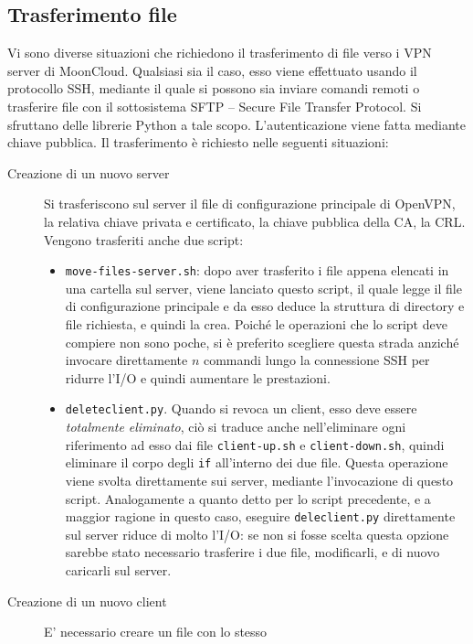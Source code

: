 \subsection{Trasferimento file}
Vi sono diverse situazioni che richiedono il trasferimento di file
verso i VPN server di MoonCloud. Qualsiasi sia il caso, esso viene effettuato
usando il protocollo SSH, mediante il quale si possono sia inviare comandi remoti
o trasferire file con il sottosistema SFTP -- Secure File Transfer Protocol. Si sfruttano
delle librerie Python a tale scopo. L'autenticazione viene fatta mediante chiave
pubblica.
Il trasferimento è richiesto nelle seguenti situazioni:
\begin{description}
	\item[Creazione di un nuovo server]Si trasferiscono sul server il file
	di configurazione principale di OpenVPN, la relativa chiave privata e certificato,
	la chiave pubblica della CA, la CRL.
	Vengono trasferiti anche due script:
	\begin{itemize}
		\item \texttt{move-files-server.sh}: dopo aver trasferito i file appena elencati
		      in una cartella sul server, viene lanciato questo script, il quale legge il file
		      di configurazione principale e da esso deduce la struttura di directory e file
		      richiesta, e quindi la crea.
		      Poiché le operazioni che lo script deve compiere non sono poche, si è
		      preferito scegliere questa strada anziché invocare direttamente $n$ commandi 
		      lungo la connessione SSH per ridurre l'I/O e quindi aumentare le prestazioni.
		\item \texttt{deleteclient.py}. Quando si revoca un client, esso deve essere
		      \textit{totalmente eliminato}, ciò si traduce anche nell'eliminare ogni riferimento
		      ad esso dai file \texttt{client-up.sh} e \texttt{client-down.sh}, quindi eliminare
		      il corpo degli \texttt{if} all'interno dei due file. Questa operazione viene
		      svolta direttamente sui server, mediante l'invocazione di questo script.
		      Analogamente a quanto detto per lo script precedente, e a maggior ragione in questo
		      caso, eseguire \texttt{deleclient.py} direttamente sul server riduce di molto l'I/O:
		      se non si fosse scelta questa opzione sarebbe stato necessario trasferire i due file,
		      modificarli, e di nuovo caricarli sul server.
	\end{itemize}
	\item[Creazione di un nuovo client]E' necessario creare un file con lo stesso

\end{description}
